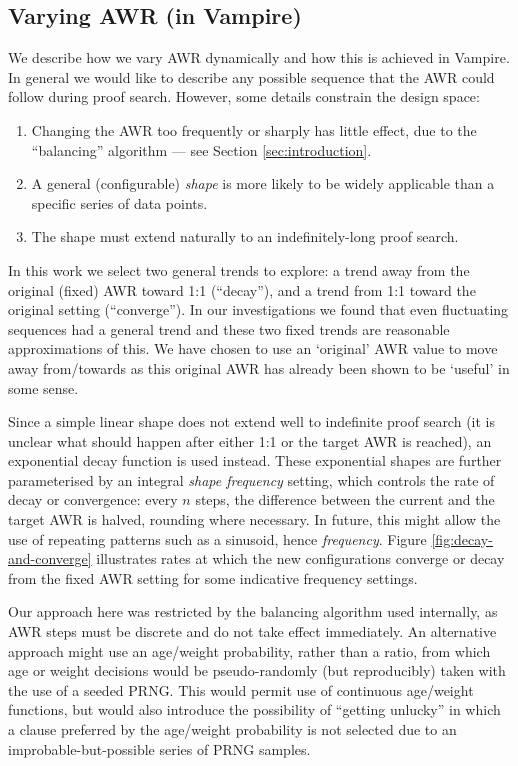 \documentclass{llncs}
\begin{document}
\subsection{Varying AWR (in Vampire)} \label{sec:varying:implementation}

We describe how we vary AWR dynamically and how this is achieved in Vampire. 
%
In general we would like to describe any possible sequence that the AWR could follow during proof search.
However, some details constrain the design space:
\begin{enumerate}
	\item Changing the AWR too frequently or sharply has little effect, due to the ``balancing'' algorithm --- see Section \ref{sec:introduction}.
	\item A general (configurable) \emph{shape} is more likely to be widely applicable than a specific series of data points.
	\item The shape must extend naturally to an indefinitely-long proof search.
\end{enumerate}

In this work we select two general trends to explore: a trend away from the original (fixed) AWR toward 1:1 (``decay''), and a trend from 1:1 toward the original setting (``converge''). In our investigations we found that even fluctuating sequences had a general trend and these two fixed trends are reasonable approximations of this. We have chosen to use an `original' AWR value to move away from/towards as this original AWR has already been shown to be `useful' in some sense.

Since a simple linear shape does not extend well to indefinite proof search (it is unclear what should happen after either 1:1 or the target AWR is reached), an exponential decay function is used instead.
These exponential shapes are further parameterised by an integral \emph{shape frequency} setting, which controls the rate of decay or convergence: every \(n\) steps, the difference between the current and the target AWR is halved, rounding where necessary.
In future, this might allow the use of repeating patterns such as a sinusoid, hence \emph{frequency}.
Figure \ref{fig:decay-and-converge} illustrates rates at which the new configurations converge or decay from the fixed AWR setting for some indicative frequency settings.

Our approach here was restricted by the balancing algorithm used internally, as AWR steps must be discrete and do not take effect immediately.
An alternative approach might use an age/weight probability, rather than a ratio, from which age or weight decisions would be pseudo-randomly (but reproducibly) taken with the use of a seeded PRNG.
This would permit use of continuous age/weight functions, but would also introduce the possibility of ``getting unlucky'' in which a clause preferred by the age/weight probability is not selected due to an improbable-but-possible series of PRNG samples.
\end{document}
